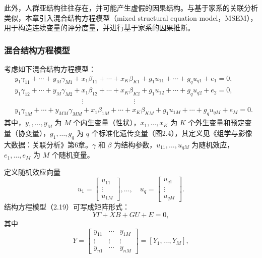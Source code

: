 此外，人群亚结构往往存在，并可能产生虚假的因果结构。与基于家系的关联分析类似，本章引入混合结构方程模型（mixed structural equation model，MSEM），用于构造连续变量的评分度量，并进行基于家系的因果推断。

\subsubsection{混合结构方程模型}

考虑如下混合结构方程模型：
\begin{equation}
\begin{aligned}
&y_1\gamma_{11}+\cdots+y_M\gamma_{M1}
+x_1\beta_{11}+\cdots+x_K\beta_{K1}
+g_1u_{11}+\cdots+g_qu_{q1}+e_1=0,\\
&y_1\gamma_{12}+\cdots+y_M\gamma_{M2}
+x_1\beta_{12}+\cdots+x_K\beta_{K2}
+g_1u_{12}+\cdots+g_qu_{q2}+e_2=0,\\
&\hspace{4cm}\vdots\hspace{3cm}\vdots\\
&y_1\gamma_{1M}+\cdots+y_{MM}\gamma_{MM}
+x_1\beta_{1M}+\cdots+x_K\beta_{KM}
+g_1u_{1M}+\cdots+g_qu_{qM}+e_M=0.
\end{aligned}\tag{2.19}
\end{equation}
其中，$y_1,\ldots,y_M$ 为 $M$ 个内生变量（性状），$x_1,\ldots,x_K$ 为 $K$ 个外生变量和预定变量（协变量），$g_1,\ldots,g_q$ 为 $q$ 个标准化遗传变量（图2.4），其定义见《组学与影像大数据：关联分析》第6章。$\gamma$ 和 $\beta$ 为结构参数，$u_{11},\ldots,u_{qM}$ 为随机效应，$e_1,\ldots,e_M$ 为 $M$ 个随机变量。
\begin{figure}[htbp]
\centering
{}
\end{figure}
定义随机效应向量
\[
u_1=\begin{bmatrix}u_{11}\\\vdots\\u_{1M}\end{bmatrix},
\ldots,\quad
u_q=\begin{bmatrix}u_{q1}\\\vdots\\u_{qM}\end{bmatrix}.
\]
结构方程模型（2.19）可写成矩阵形式：
\begin{equation}
Y\Gamma+XB+GU+E=0,
\tag{2.20}
\end{equation}
其中
\[
Y=\begin{bmatrix}
y_{11}&\cdots&y_{1M}\\\vdots&\vdots&\vdots\\y_{n1}&\cdots&y_{nM}
\end{bmatrix}=[Y_1,\ldots,Y_M],
\]
